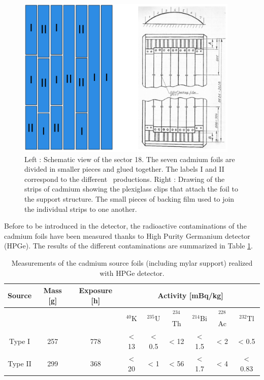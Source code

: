 \documentclass[main.tex]{subfiles}
\begin{document}
\bigskip


\begin{figure}[h!]
\includegraphics[height=7.7cm]{pictures/Chap6/schemaFoil_v2.pdf}
\centering
\caption{Left : Schematic view of the sector 18. The seven cadmium foils are divided in smaller pieces and glued together. The labels I and II correspond to the different \Cd~productions. Right : Drawing of the strips of cadmium showing the plexiglass clips that attach the foil to the support structure. The small pieces of backing film used to join the individual strips to one another.}
\label{CdFoil}
\end{figure}


\NI Before to be introduced in the detector, the radioactive contaminations of the cadmium foils have been measured thanks to High Purity Germanium detector (HPGe). The results of the different contaminations are summarized in Table \ref{TableContaminationMeasurements}.


\bigskip


\begin{table}[h!]
\begin{center}
\begin{tabular}{c|c|c|c|c|c|c|c|c}
   \toprule
   Source  & Mass [g] & Exposure [h] &\multicolumn{6}{c|}{Activity [mBq/kg]} \\
   \midrule[0.05cm]
           &          &              & $^{\text{40}}$K &  $^{\text{235}}$U &  $^{\text{234}}$Th & $^{\text{214}}$Bi  & $^{\text{228}}$Ac & $^{\text{232}}$Tl \\[0.1cm]
   Type I  & 257      & 778          & < 13     & < 0.5      & < 12        & < 1.5                  & < 2        & < 0.5 \\
   Type II & 299      & 368          & < 20     & < 1        & < 56        & < 1.7                  & < 4        & < 0.83 \\
   \bottomrule
\end{tabular}
\caption{Measurements of the cadmium source foils (including mylar support) realized with HPGe detector.}
\label{TableContaminationMeasurements}
\end{center}
\end{table}
\end{document}
